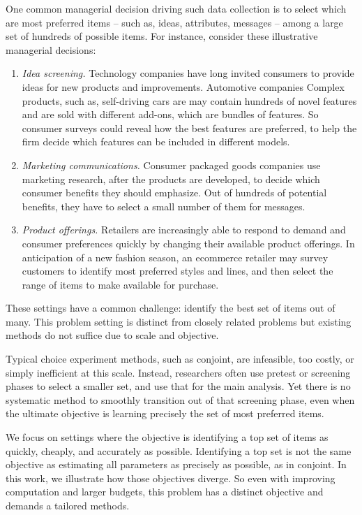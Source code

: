 \documentclass[nonblindrev]{informs3}
\begin{document}
One common managerial decision driving such data collection is to select which are most preferred items -- such as, ideas, attributes, messages -- among a large set of hundreds of possible items. For instance, consider these illustrative managerial decisions: 
\begin{enumerate}
	\item \emph{Idea screening.} Technology companies have long invited consumers to provide ideas for new products and improvements. Automotive companies Complex products, such as, self-driving cars are may contain hundreds of novel features and are sold with different add-ons, which are bundles of features. So consumer surveys could reveal how the best features are preferred, to help the firm decide which features can be included in different models. 
	\item \emph{Marketing communications.} Consumer packaged goods companies use marketing research, after the products are developed, to decide which consumer benefits they should emphasize. Out of hundreds of potential benefits, they have to select a small number of them for messages.
	\item \emph{Product offerings.} Retailers are increasingly able to respond to demand and consumer preferences quickly by changing their available product offerings. In anticipation of a new fashion season, an ecommerce retailer may survey customers to identify most preferred styles and lines, and then select the range of items to make available for purchase. 
\end{enumerate} 

These settings have a common challenge: identify the best set of items out of many.  This problem setting is distinct from closely related problems but existing methods do not suffice due to scale and objective. 

Typical choice experiment methods, such as conjoint, are infeasible, too costly, or simply inefficient at this scale. Instead, researchers often use pretest or screening phases to select a smaller set, and use that for the main analysis. Yet there is no systematic method to smoothly transition out of that screening phase, even when the ultimate objective is learning precisely the set of most preferred items. 

We focus on settings where the objective is identifying a top set of items as quickly, cheaply, and accurately as possible. Identifying a top set is not the same objective as estimating all parameters as precisely as possible, as in conjoint. In this work, we illustrate how those objectives diverge. So even with improving computation and larger budgets, this problem has a distinct objective and demands a tailored methods. 
\end{document}
